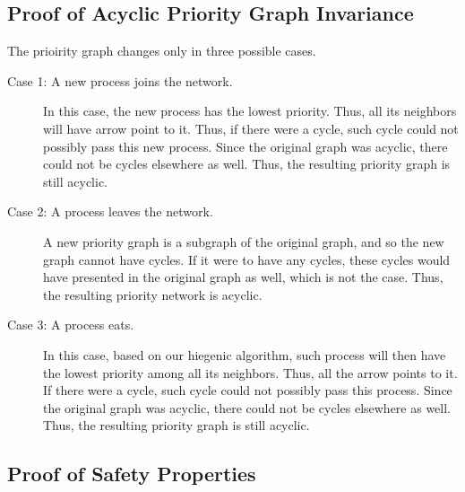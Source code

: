 \documentclass[11pt]{article}
\begin{document}
\subsection{Proof of Acyclic Priority Graph Invariance}
The prioirity graph changes only in three possible cases.
\begin{description}
\item[Case 1: A new process joins the network.] In this case, the new process has the lowest priority. Thus, all its neighbors will have arrow point to it. Thus, if there were a cycle, such cycle could not possibly pass this new process. Since the original graph was acyclic, there could not be cycles elsewhere as well. Thus, the resulting priority graph is still acyclic.
\item[Case 2: A process leaves the network.] A new priority graph is a subgraph of the original graph, and so the new graph cannot have cycles. If it were to have any cycles, these cycles would have presented in the original graph as well, which is not the case. Thus, the resulting priority network is acyclic.
\item[Case 3: A process eats.] In this case, based on our hiegenic algorithm, such process will then have the lowest priority among all its neighbors. Thus, all the arrow points to it. If there were a cycle, such cycle could not possibly pass this process. Since the original graph was acyclic, there could not be cycles elsewhere as well. Thus, the resulting priority graph is still acyclic.
\end{description}

\subsection{Proof of Safety Properties}
\end{document}

